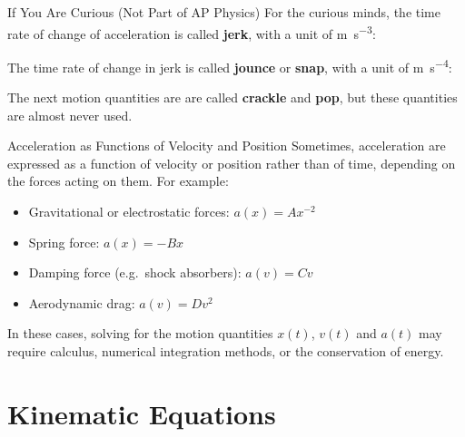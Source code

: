 \documentclass[12pt,compress,aspectratio=169]{beamer}
\begin{document}
\begin{frame}{If You Are Curious (Not Part of AP Physics)}
  For the curious minds, the time rate of change of acceleration is called
  \textbf{jerk}, with a unit of \si{\metre\per\second^3}:


  The time rate of change in jerk is called \textbf{jounce} or \textbf{snap},
  with a unit of \si{\metre\per\second^4}:
  
  
  The next motion quantities are are called \textbf{crackle} and \textbf{pop},
  but these quantities are almost never used.\vspace{.3in}
\end{frame}



\begin{frame}{Acceleration as Functions of Velocity and Position}
  Sometimes, acceleration are expressed as a function of velocity or position
  rather than of time, depending on the forces acting on them. For example:
  \begin{itemize}
  \item Gravitational or electrostatic forces: $a(x)=Ax^{-2}$
  \item Spring force: $\displaystyle a(x)=-Bx$
  \item Damping force (e.g.\ shock absorbers): $a(v)=Cv$
  \item Aerodynamic drag: $a(v)=Dv^2$
  \end{itemize}
  In these cases, solving for the motion quantities $x(t)$, $v(t)$ and $a(t)$
  may require calculus, numerical integration methods, or the conservation of
  energy.
\end{frame}



\section{Kinematic Equations}
\end{document}
